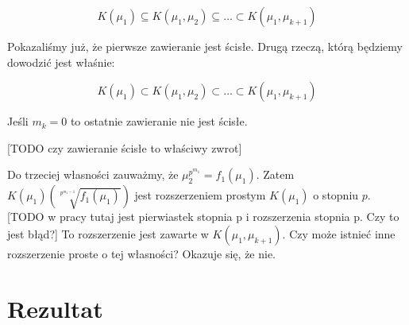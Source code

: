 \[
  K\left(\mu_1\right) \subseteq
  K\left(\mu_1, \mu_2\right) \subseteq
  \ldots \subset
  K\left(\mu_1, \mu_{k+1}\right)
\]

Pokazaliśmy już, że pierwsze zawieranie jest ścisłe. Drugą rzeczą, którą
będziemy dowodzić jest właśnie:

\begin{equation}
  K(\mu_1) \subset
  K(\mu_1, \mu_2) \subset
  \ldots \subset
  K(\mu_1, \mu_{k+1})
  \label{eq:strict_tower}
\end{equation}

Jeśli $m_k = 0$ to ostatnie zawieranie nie jest ścisłe.

[TODO czy zawieranie ścisłe to właściwy zwrot]

Do trzeciej własności zauważmy, że $\mu_2^{p^{m_1}} = f_1\left(\mu_1\right)$.
Zatem $K\left(\mu_1\right)\left(\sqrt[p^{m_1 -
1}]{f_1\left(\mu_1\right)}\right)$ jest rozszerzeniem prostym
$K\left(\mu_1\right)$ o stopniu $p$.
[TODO w pracy tutaj jest pierwiastek stopnia p i rozszerzenia stopnia p. Czy to
jest błąd?]
To rozszerzenie jest zawarte w $K\left(\mu_1, \mu_{k+1}\right)$. Czy może
istnieć inne rozszerzenie proste o tej własności? Okazuje się, że nie.

\section{Rezultat}
